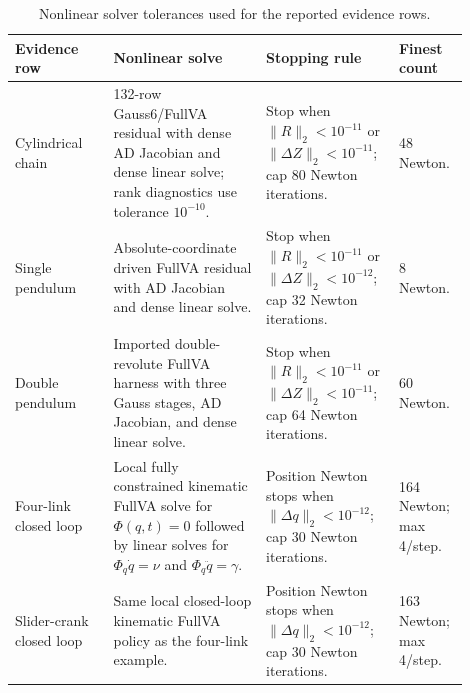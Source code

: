 \documentclass[preprint,12pt]{elsarticle}
\newcommand{\method}{Gauss6\slash FullVA}
\begin{document}
\begin{table}[htbp]
\centering
\caption{Nonlinear solver tolerances used for the reported evidence rows.}
\label{tab:solver-tolerances}
\scriptsize
\setlength{\tabcolsep}{3pt}
\begin{tabular}{P{0.20\linewidth}P{0.31\linewidth}P{0.27\linewidth}P{0.12\linewidth}}
\toprule
Evidence row & Nonlinear solve & Stopping rule & Finest count \\
\midrule
Cylindrical chain &
132-row \method{} residual with dense AD Jacobian and dense linear solve;
rank diagnostics use tolerance $10^{-10}$. &
Stop when $\|R\|_2<10^{-11}$ or $\|\Delta Z\|_2<10^{-11}$; cap 80 Newton
iterations. &
48 Newton. \\
Single pendulum &
Absolute-coordinate driven FullVA residual with AD Jacobian and dense linear
solve. &
Stop when $\|R\|_2<10^{-11}$ or $\|\Delta Z\|_2<10^{-12}$; cap 32 Newton
iterations. &
8 Newton. \\
Double pendulum &
Imported double-revolute FullVA harness with three Gauss stages, AD Jacobian,
and dense linear solve. &
Stop when $\|R\|_2<10^{-11}$ or $\|\Delta Z\|_2<10^{-11}$; cap 64 Newton
iterations. &
60 Newton. \\
Four-link closed loop &
Local fully constrained kinematic FullVA solve for $\Phi(q,t)=0$ followed by
linear solves for $\Phi_q\dot q=\nu$ and $\Phi_q\ddot q=\gamma$. &
Position Newton stops when $\|\Delta q\|_2<10^{-12}$; cap 30 Newton
iterations. &
164 Newton; max 4/step. \\
Slider-crank closed loop &
Same local closed-loop kinematic FullVA policy as the four-link example. &
Position Newton stops when $\|\Delta q\|_2<10^{-12}$; cap 30 Newton
iterations. &
163 Newton; max 4/step. \\
\bottomrule
\end{tabular}
\end{table}
\end{document}
